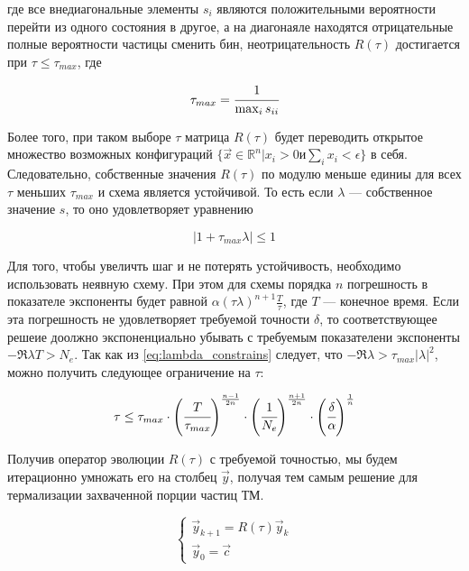 где все внедиагональные элементы $s_i$ являются положительными вероятности перейти из одного состояния в другое, а на диагонаяле находятся отрицательные полные вероятности частицы сменить бин, неотрицательность 
$R(\tau)$ достигается при $\tau  \le \tau_{max}$, где

\begin{equation}
	\label{eq:tau_max}
	\tau_{max} = \cfrac{1}{\max_i{s_{ii}}}
\end{equation}

Более того, при таком выборе $\tau$ матрица $R(\tau)$ будет переводить открытое множество возможных конфигураций
$\{\vec{x} \in \mathbb{R}^n | x_i > 0 и \sum_i{x_i} < \epsilon \}$ в себя. Следовательно, собственные значения $R(\tau)$ по модулю меньше единиы для всех $\tau$ меньших $\tau_{max}$ и схема является устойчивой. То есть если $\lambda$ --- собственное значение $s$, то оно удовлетворяет уравнению

\begin{equation}
	\label{eq:lambda_constrains}
	|1+\tau_{max}\lambda| \le 1
\end{equation}

Для того, чтобы увеличть шаг и не потерять устойчивость, необходимо использовать неявную схему. При этом для схемы порядка $n$ погрешность в показателе экспоненты будет равной $\alpha (\tau \lambda)^{n+1} \frac{T}{\tau}$, где $T$ --- конечное время. Если эта погрешность не удовлетворяет требуемой точности $\delta$, то соответствующее решеие доолжно экспоненциально убывать с требуемым показателени экспоненты $-\Re{\lambda} T > N_e$. Так как из \ref{eq:lambda_constrains} следует, что $-\Re{\lambda} > \tau_{max} |\lambda|^2$, можно получить следующее ограничение на $\tau$:

\begin{equation}
	\label{eq:tau_constrains}
	\tau \le \tau_{max}\cdot \left(\cfrac{T}{\tau_{max}}\right)^\frac{n-1}{2n}\cdot 
	\left(\cfrac{1}{N_e}\right)^{\frac{n+1}{2n}}\cdot  \left(\cfrac{\delta}{\alpha}\right)^{\frac{1}{n}}
\end{equation}

Получив оператор эволюции $R(\tau)$ с требуемой точностью, мы будем итерационно умножать его на столбец $\vec{y}$, получая тем самым решение для термализации захваченной порции частиц ТМ.

\begin{equation}
	\label{eq:solver_y}
	\begin{cases}
		\vec{y}_{k+1} = R(\tau) \vec{y}_k\\
		\vec{y}_0 = \vec{c}
	\end{cases}
\end{equation}

